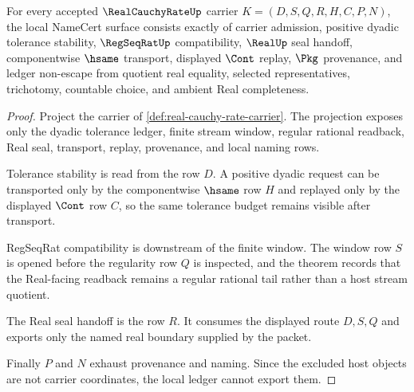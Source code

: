\begin{theorem}
\label{thm:real-cauchy-rate-regular-namecert}
For every accepted $\RealCauchyRateUp$ carrier $K=(D,S,Q,R,H,C,P,N)$, the local NameCert surface consists exactly of carrier admission, positive dyadic tolerance stability, $\RegSeqRatUp$ compatibility, $\RealUp$ seal handoff, componentwise $\hsame$ transport, displayed $\Cont$ replay, $\Pkg$ provenance, and ledger non-escape from quotient real equality, selected representatives, trichotomy, countable choice, and ambient Real completeness.
\end{theorem}
\begin{proof}
Project the carrier of \autoref{def:real-cauchy-rate-carrier}. The projection exposes only the dyadic tolerance ledger, finite stream window, regular rational readback, Real seal, transport, replay, provenance, and local naming rows.

Tolerance stability is read from the row $D$. A positive dyadic request can be transported only by the componentwise $\hsame$ row $H$ and replayed only by the displayed $\Cont$ row $C$, so the same tolerance budget remains visible after transport.

RegSeqRat compatibility is downstream of the finite window. The window row $S$ is opened before the regularity row $Q$ is inspected, and the theorem records that the Real-facing readback remains a regular rational tail rather than a host stream quotient.

The Real seal handoff is the row $R$. It consumes the displayed route $D,S,Q$ and exports only the named real boundary supplied by the packet.

Finally $P$ and $N$ exhaust provenance and naming. Since the excluded host objects are not carrier coordinates, the local ledger cannot export them.
\end{proof}


\begin{closurestatus}{\RealCauchyRateUp}
  \theoryclosure{\seedClosure}
  \formalstatus{\unformalizedV}
\end{closurestatus}
